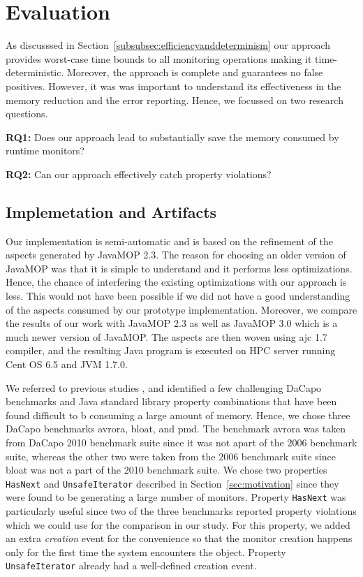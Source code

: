 \section{Evaluation}
\label{sec:evaluation}

As discusssed in Section~\ref{subsubsec:efficiencyanddeterminism} our approach 
provides worst-case time bounds to all monitoring operations making it 
time-deterministic. Moreover, the approach is complete and guarantees no false 
positives. However, it was was important to understand its effectiveness in the 
memory reduction and the error reporting. Hence, we focussed on two research 
questions.

{\bf RQ1:} Does our approach lead to substantially save the memory consumed by 
runtime monitors?

{\bf RQ2:} Can our approach effectively catch property violations?

\subsection{Implemetation and Artifacts}
\label{subsec:implementation}

Our implementation is semi-automatic and is based on the refinement of the 
aspects generated by JavaMOP 2.3. The reason for choosing an older version of 
JavaMOP was that it is simple to understand and it performs less optimizations. 
Hence, the chance of interfering the existing optimizations with our approach is 
less. This would not have been possible if we did not have a good understanding 
of the aspects consumed by our prototype implementation. Moreover, we compare 
the results of our work with JavaMOP 2.3 as well as JavaMOP 3.0 which is a much 
newer version of JavaMOP. The aspects are then woven using ajc 1.7 compiler, and 
the resulting Java program is executed on HPC server running Cent OS 6.5 and JVM 
1.7.0. 

We referred to previous studies \cite{}, and identified a few challenging DaCapo 
benchmarks and Java standard library property combinations that have been found 
difficult to b consuming a large amount of memory. Hence, we chose three DaCapo 
benchmarks \textsf{avrora}, \textsf{bloat}, and \textsf{pmd}. The benchmark 
\textsf{avrora} was taken from DaCapo 2010 benchmark suite since it was not 
apart of the 2006 benchmark suite, whereas the other two were taken from the 
2006 benchmark suite since \textsf{bloat} was not a part of the 2010 benchmark 
suite. We chose two properties \texttt{HasNext} and \texttt{UnsafeIterator} 
described in Section~\ref{sec:motivation} since they were found to be generating 
a large number of monitors. Property \texttt{HasNext} was particularly useful 
since two of the three benchmarks reported property violations which we could 
use for the comparison in our study. For this property, we added an extra 
\textit{creation} event for the convenience so that the monitor creation happens 
only 
for the first time the system encounters the object. Property 
\texttt{UnsafeIterator} already had a well-defined creation event.

